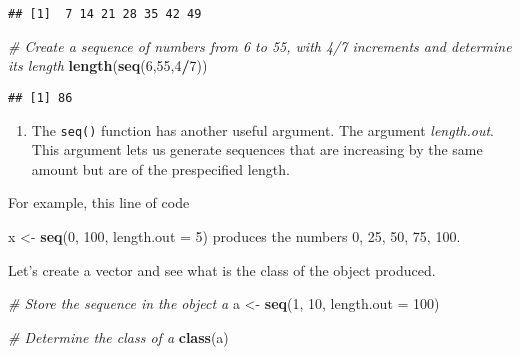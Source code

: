 \documentclass[]{article}
\newenvironment{Shaded}{\begin{snugshade}}{\end{snugshade}}
\newcommand{\CommentTok}[1]{\textcolor[rgb]{0.56,0.35,0.01}{\textit{#1}}}
\newcommand{\DataTypeTok}[1]{\textcolor[rgb]{0.13,0.29,0.53}{#1}}
\newcommand{\DecValTok}[1]{\textcolor[rgb]{0.00,0.00,0.81}{#1}}
\newcommand{\FloatTok}[1]{\textcolor[rgb]{0.00,0.00,0.81}{#1}}
\newcommand{\KeywordTok}[1]{\textcolor[rgb]{0.13,0.29,0.53}{\textbf{#1}}}
\newcommand{\NormalTok}[1]{#1}
\newcommand{\OperatorTok}[1]{\textcolor[rgb]{0.81,0.36,0.00}{\textbf{#1}}}
\newcommand{\StringTok}[1]{\textcolor[rgb]{0.31,0.60,0.02}{#1}}
\providecommand{\tightlist}{%
  \setlength{\itemsep}{0pt}\setlength{\parskip}{0pt}}
\begin{document}
\begin{verbatim}
## [1]  7 14 21 28 35 42 49
\end{verbatim}

\begin{Shaded}
\begin{Highlighting}[]
\CommentTok{# Create a sequence of numbers from 6 to 55, with 4/7 increments and determine its length}
\KeywordTok{length}\NormalTok{(}\KeywordTok{seq}\NormalTok{(}\DecValTok{6}\NormalTok{,}\DecValTok{55}\NormalTok{,}\DecValTok{4}\OperatorTok{/}\DecValTok{7}\NormalTok{))}
\end{Highlighting}
\end{Shaded}

\begin{verbatim}
## [1] 86
\end{verbatim}

\begin{enumerate}
\def\labelenumi{\arabic{enumi}.}
\setcounter{enumi}{8}
\tightlist
\item
  The \texttt{seq()} function has another useful argument. The argument
  \emph{length.out}. This argument lets us generate sequences that are
  increasing by the same amount but are of the prespecified length.
\end{enumerate}

For example, this line of code

\begin{Shaded}
\begin{Highlighting}[]
\NormalTok{x <-}\StringTok{ }\KeywordTok{seq}\NormalTok{(}\DecValTok{0}\NormalTok{, }\DecValTok{100}\NormalTok{, }\DataTypeTok{length.out =} \DecValTok{5}\NormalTok{)}
\NormalTok{produces the numbers }\DecValTok{0}\NormalTok{, }\DecValTok{25}\NormalTok{, }\DecValTok{50}\NormalTok{, }\DecValTok{75}\NormalTok{, }\FloatTok{100.}
\end{Highlighting}
\end{Shaded}

Let's create a vector and see what is the class of the object produced.

\begin{Shaded}
\begin{Highlighting}[]
\CommentTok{# Store the sequence in the object a}
\NormalTok{a <-}\StringTok{ }\KeywordTok{seq}\NormalTok{(}\DecValTok{1}\NormalTok{, }\DecValTok{10}\NormalTok{, }\DataTypeTok{length.out =} \DecValTok{100}\NormalTok{)}

\CommentTok{# Determine the class of a}
\KeywordTok{class}\NormalTok{(a)}
\end{Highlighting}
\end{Shaded}
\end{document}
